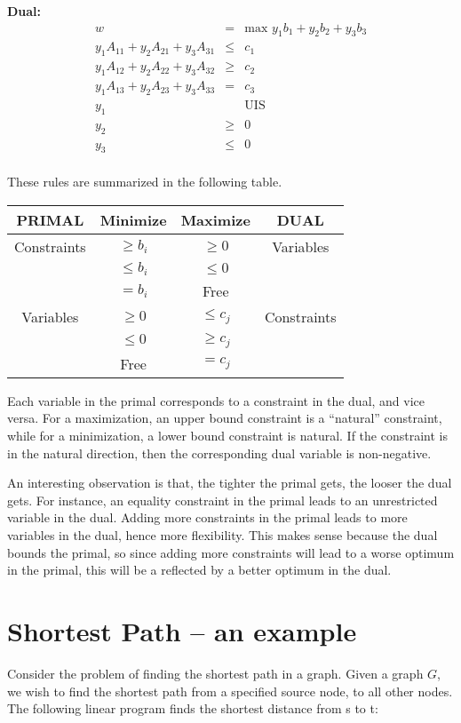 \documentclass[11pt]{article}
\begin{document}
{\bf Dual:}\\
\begin{eqnarray*}
w&=&\mbox{max }y_1b_1+y_2b_2+y_3b_3\\
y_1A_{11}+y_2A_{21}+y_3A_{31}&\leq&c_1\\
y_1A_{12}+y_2A_{22}+y_3A_{32}&\geq&c_2\\
y_1A_{13}+y_2A_{23}+y_3A_{33}&=&c_3\\
y_1& &\mbox{UIS}\\
y_2&\geq&0\\
y_3&\leq&0\\
\end{eqnarray*}

These rules are summarized in the following table.

\begin{center}
\begin{tabular}{|c|c|c|c|}
\hline
PRIMAL&Minimize&Maximize&DUAL\\
\hline
Constraints&$\geq b_i$&$\geq0$&Variables\\
&$\leq b_i$&$\leq0$&\\
&$= b_i$&Free&\\
\hline
Variables&$\geq 0$&$\leq c_j$&Constraints\\
&$\leq 0$&$\geq c_j$&\\
&Free&$=c_j$&\\
\hline
\end{tabular}
\end{center}

Each variable in the primal corresponds to a constraint in the dual, and vice versa. For a maximization, an upper bound constraint is a ``natural'' constraint, while for a minimization, a lower bound constraint is natural. If the constraint is in the natural direction, then the corresponding dual variable is non-negative. 

An interesting observation is that, the tighter the primal gets, the looser the dual gets. For instance, an equality constraint in the primal leads to an unrestricted variable in the dual. Adding more constraints in the primal leads to more variables in the dual, hence more flexibility. This makes sense because the dual bounds the primal, so since adding more constraints will lead to a worse optimum in the primal, this will be a reflected by a better optimum in the dual.

\section{Shortest Path -- an example}
Consider the problem of finding the shortest path in a graph. Given a graph $G$, we wish to find the shortest path from a specified source node, to all other nodes. The following linear program finds the shortest distance from s to t:
\end{document}
